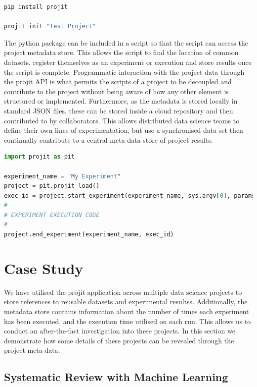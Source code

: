 \documentclass[sigconf]{acmart}
\begin{document}
\begin{lstlisting}[language=BASH,label={code:install}, caption=Installation and Invocation of Projit CLI]
pip install projit

projit init "Test Project"
\end{lstlisting}

The python package can be included in a script so that the script can access the 
project metadata store. This allows the script to find the location of common 
datasets, register themselves as an experiment or execution and store results once 
the script is complete. Programmatic interaction with the project data through
the projit API is what permits the scripts of a project to be decoupled and 
contribute to the project without being aware of how any other element is 
structured or implemented. Furthermore, as the metadata
is stored locally in standard JSON files, these can be stored inside a cloud 
repository and then contributed to by collaborators. 
This allows distributed data science teams to define their own lines of experimentation,
but use a synchronised data set then continually contribute to a central meta-data 
store of project results.

\begin{lstlisting}[language=Python,label={code:usage}, caption=Usage of Projit Python Library]
import projit as pit

experiment_name = "My Experiment"
project = pit.projit_load()
exec_id = project.start_experiment(experiment_name, sys.argv[0], params={})
#
# EXPERIMENT EXECUTION CODE 
#
project.end_experiment(experiment_name, exec_id)
\end{lstlisting}


\section{Case Study}

We have utilised the projit application across multiple data science projects to store 
references to reusable datasets and experimental resultss. Additionally, the metadata store 
contains information about the number of times each experiment has been executed, 
and the execution time utilised on each run. This allows us to conduct an after-the-fact
investigation into these projects. In this section we demonstrate how some details of these
projects can be revealed through the project meta-data.

\subsection{Systematic Review with Machine Learning}
\end{document}
